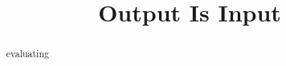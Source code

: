 \documentclass{ximera}
\title{Output Is Input}
\begin{document}
\begin{abstract}
evaluating
\end{abstract}
\maketitle












\begin{center}
\end{center}








\begin{center}
\end{center}
\end{document}
